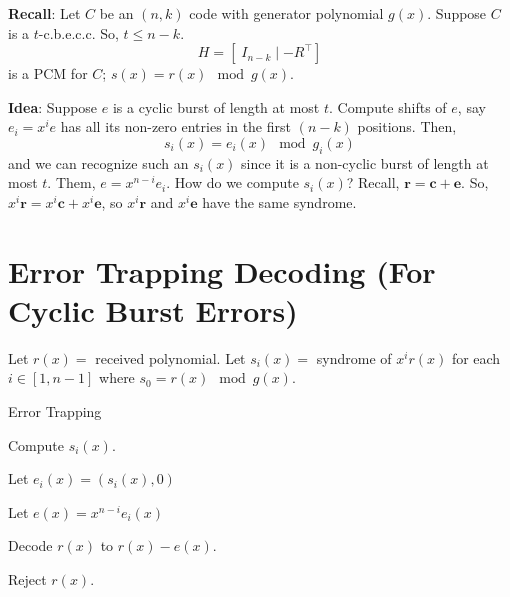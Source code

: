 \textbf{Recall}: Let $ C $ be an $ (n,k) $ code with generator polynomial
$ g(x) $. Suppose $ C $ is a $ t $-c.b.e.c.c. So, $ t\leqslant n-k $.
\[ H=\left[ \; I_{n-k}\mid -R^\top \right] \]
is a PCM for $ C $; $ s(x)=r(x)\mod g(x) $.

\textbf{Idea}: Suppose $ e $ is a cyclic burst of length at most $ t $.
Compute shifts of $ e $, say $ e_i=x^i e $ has all its non-zero entries in the first
$ (n-k) $ positions. Then,
\[ s_i(x)=e_i(x)\mod g_i(x) \]
and we can recognize such an $ s_i(x) $ since it is a non-cyclic burst of length
at most $ t $. Them, $ e=x^{n-i}e_i $. How do we compute $ s_i(x) $? Recall,
$ \bm{r}=\bm{c}+\bm{e} $. So, $ x^i \bm{r}=x^i\bm{c}+x^i\bm{e} $, so
$ x^i \bm{r} $ and $ x^i\bm{e} $ have the same syndrome.

\section{Error Trapping Decoding (For Cyclic Burst Errors)}
Let $ r(x)= $ received polynomial. Let $ s_i(x)= $ syndrome of $ x^i r(x) $ for
each $ i\in[1,n-1] $ where $ s_0=r(x)\mod g(x) $.

\begin{algbox}
    \begin{algorithm}[H]
        \caption{Error Trapping}

         {
        Compute $ s_i(x) $.

         {
        Let $ e_i(x)=(s_i(x),0) $

        Let $ e(x)=x^{n-i}e_i(x) $

        Decode $ r(x) $ to $ r(x)-e(x) $.
        }
        }
        Reject $ r(x) $.
    \end{algorithm}
\end{algbox}

